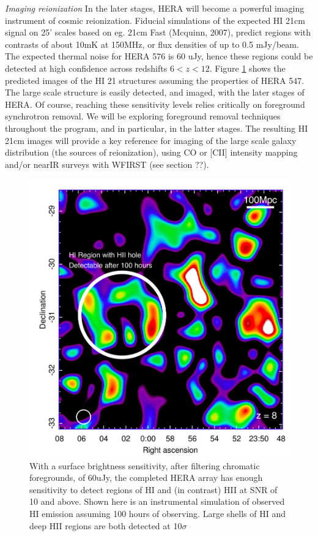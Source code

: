 \documentclass[preprint]{aastex}
\begin{document}
{\sl Imaging reionization} In the later stages, HERA will become a powerful imaging instrument of cosmic reionization. Fiducial simulations of the expected HI 21cm signal on 25' scales based on eg. 21cm Fast (Mcquinn, 2007), predict regions with contrasts of about 10mK at 150MHz, or flux densities of up to 0.5 mJy/beam. The expected thermal noise for HERA 576 is 60 uJy, hence these regions could be detected at high confidence across redshifts $6<z<12$. Figure \ref{imaging} shows the predicted images of the HI 21 structures  assuming the properties of HERA 547. The large scale structure is easily detected, and imaged, with the later stages of HERA. Of course, reaching these sensitivity levels relies critically on foreground synchrotron removal. We will be exploring foreground removal techniques throughout the program, and in particular, in the latter stages. The resulting HI 21cm images will provide a key reference for imaging of the large scale galaxy distribution (the sources of reionization), using CO or [CII] intensity mapping and/or nearIR surveys with WFIRST (see section ??).
\begin{figure}

\includegraphics[height=4.in]{plots/HERA_z8_SNR_annotated.jpg}
\caption{\small With a surface brightness sensitivity, after filtering chromatic foregrounds, of 60uJy, the completed HERA array has enough sensitivity to detect regions of HI and (in contrast) HII at SNR of 10 and above. Shown here is an instrumental simulation of observed HI emission assuming 100 hours of observing. Large shells of HI and deep HII regions are both detected at 10$\sigma$  \label{imaging}}
\end{figure}
\end{document}
